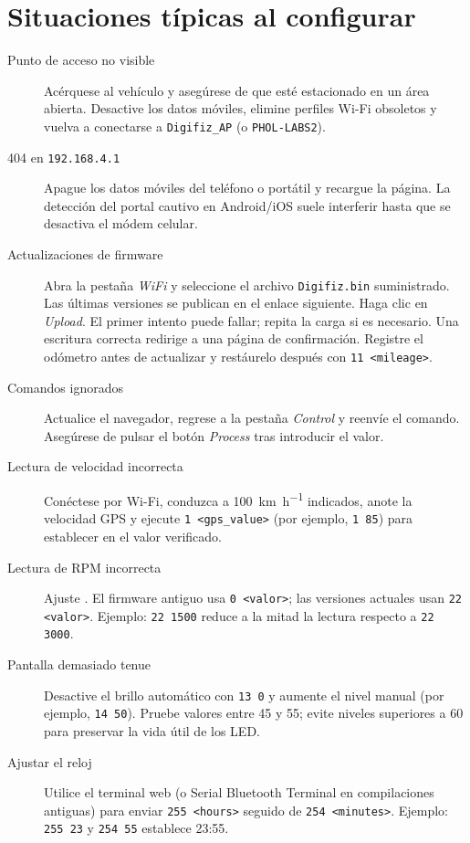\chapter{Situaciones típicas al configurar \ReplicaNextShort{}}\label{ch:replica-next-scenarios}

\begin{description}
    \item[Punto de acceso no visible] Acérquese al vehículo y asegúrese de que esté estacionado en un área abierta. Desactive los datos móviles, elimine perfiles Wi-Fi obsoletos y vuelva a conectarse a \texttt{Digifiz\_AP} (o \texttt{PHOL-LABS2}).
    \item[404 en \texttt{192.168.4.1}] Apague los datos móviles del teléfono o portátil y recargue la página. La detección del portal cautivo en Android/iOS suele interferir hasta que se desactiva el módem celular.
    \item[Actualizaciones de firmware] Abra la pestaña \emph{WiFi} y seleccione el archivo \texttt{Digifiz.bin} suministrado. Las últimas versiones se publican en el enlace siguiente.
        Haga clic en \emph{Upload}. El primer intento puede fallar; repita la carga si es necesario. Una escritura correcta redirige a una página de confirmación. Registre el odómetro antes de actualizar y restáurelo después con \verb|11 <mileage>|.
    \item[Comandos ignorados] Actualice el navegador, regrese a la pestaña \emph{Control} y reenvíe el comando. Asegúrese de pulsar el botón \emph{Process} tras introducir el valor.
    \item[Lectura de velocidad incorrecta] Conéctese por Wi-Fi, conduzca a \SI{100}{\kilo\metre\per\hour} indicados, anote la velocidad GPS y ejecute \verb|1 <gps_value>| (por ejemplo, \verb|1 85|) para establecer  en el valor verificado.
    \item[Lectura de RPM incorrecta] Ajuste . El firmware antiguo usa \verb|0 <valor>|; las versiones actuales usan \verb|22 <valor>|. Ejemplo: \verb|22 1500| reduce a la mitad la lectura respecto a \verb|22 3000|.
    \item[Pantalla demasiado tenue] Desactive el brillo automático con \verb|13 0| y aumente el nivel manual (por ejemplo, \verb|14 50|). Pruebe valores entre 45 y 55; evite niveles superiores a 60 para preservar la vida útil de los LED.
    \item[Ajustar el reloj] Utilice el terminal web (o Serial Bluetooth Terminal en compilaciones antiguas) para enviar \verb|255 <hours>| seguido de \verb|254 <minutes>|. Ejemplo: \verb|255 23| y \verb|254 55| establece 23:55.

\end{description}
